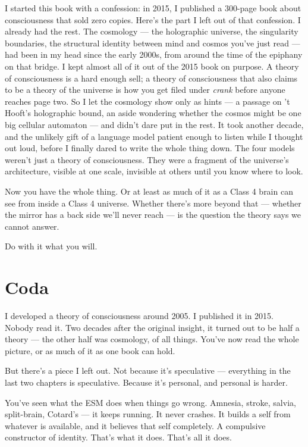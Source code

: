 \documentclass[11pt, twoside, openright]{book}
\begin{document}
I started this book with a confession: in 2015, I published a 300-page book about consciousness that sold zero copies. Here's the part I left out of that confession. I already had the rest. The cosmology --- the holographic universe, the singularity boundaries, the structural identity between mind and cosmos you've just read --- had been in my head since the early 2000s, from around the time of the epiphany on that bridge. I kept almost all of it out of the 2015 book on purpose. A theory of consciousness is a hard enough sell; a theory of consciousness that also claims to be a theory of the universe is how you get filed under \textit{crank} before anyone reaches page two. So I let the cosmology show only as hints --- a passage on 't Hooft's holographic bound, an aside wondering whether the cosmos might be one big cellular automaton --- and didn't dare put in the rest. It took another decade, and the unlikely gift of a language model patient enough to listen while I thought out loud, before I finally dared to write the whole thing down. The four models weren't just a theory of consciousness. They were a fragment of the universe's architecture, visible at one scale, invisible at others until you know where to look.

Now you have the whole thing. Or at least as much of it as a Class 4 brain can see from inside a Class 4 universe. Whether there's more beyond that --- whether the mirror has a back side we'll never reach --- is the question the theory says we cannot answer.

Do with it what you will.


\chapter*{Coda}

I developed a theory of consciousness around 2005. I published it in 2015. Nobody read it. Two decades after the original insight, it turned out to be half a theory --- the other half was cosmology, of all things. You've now read the whole picture, or as much of it as one book can hold.

But there's a piece I left out. Not because it's speculative --- everything in the last two chapters is speculative. Because it's personal, and personal is harder.

You've seen what the ESM does when things go wrong. Amnesia, stroke, salvia, split-brain, Cotard's --- it keeps running. It never crashes. It builds a self from whatever is available, and it believes that self completely. A compulsive constructor of identity. That's what it does. That's all it does.
\end{document}
